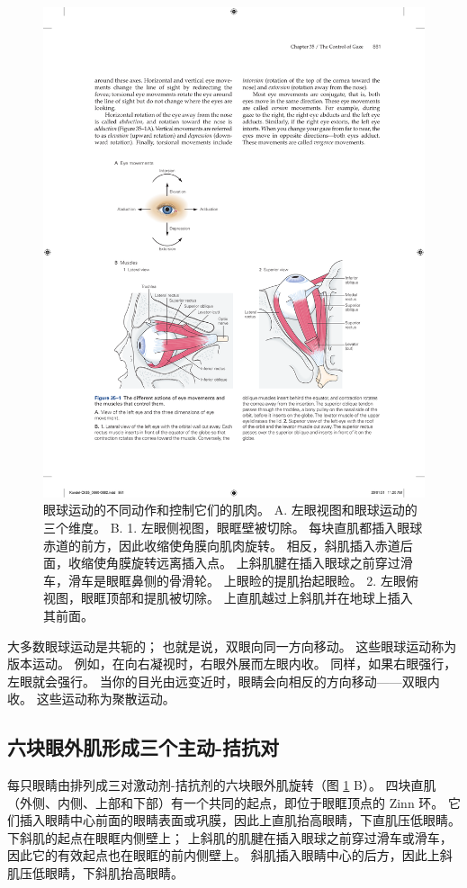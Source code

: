 \begin{figure}[htbp]
	\centering
	\includegraphics[width=0.85\linewidth]{chap35/fig_35_1}
	\caption{眼球运动的不同动作和控制它们的肌肉。 A. 左眼视图和眼球运动的三个维度。 B. 1. 左眼侧视图，眼眶壁被切除。 每块直肌都插入眼球赤道的前方，因此收缩使角膜向肌肉旋转。 相反，斜肌插入赤道后面，收缩使角膜旋转远离插入点。 上斜肌腱在插入眼球之前穿过滑车，滑车是眼眶鼻侧的骨滑轮。 上眼睑的提肌抬起眼睑。 2. 左眼俯视图，眼眶顶部和提肌被切除。 上直肌越过上斜肌并在地球上插入其前面。}
	\label{fig:35_1}
\end{figure}


大多数眼球运动是共轭的；
也就是说，双眼向同一方向移动。
这些眼球运动称为版本运动。
例如，在向右凝视时，右眼外展而左眼内收。
同样，如果右眼强行，左眼就会强行。
当你的目光由远变近时，眼睛会向相反的方向移动——双眼内收。
这些运动称为聚散运动。



\subsection{六块眼外肌形成三个主动-拮抗对}

每只眼睛由排列成三对激动剂-拮抗剂的六块眼外肌旋转（图 \ref{fig:35_1} B）。
四块直肌（外侧、内侧、上部和下部）有一个共同的起点，即位于眼眶顶点的 Zinn 环。
它们插入眼睛中心前面的眼睛表面或巩膜，因此上直肌抬高眼睛，下直肌压低眼睛。
下斜肌的起点在眼眶内侧壁上；
上斜肌的肌腱在插入眼球之前穿过滑车或滑车，因此它的有效起点也在眼眶的前内侧壁上。
斜肌插入眼睛中心的后方，因此上斜肌压低眼睛，下斜肌抬高眼睛。


